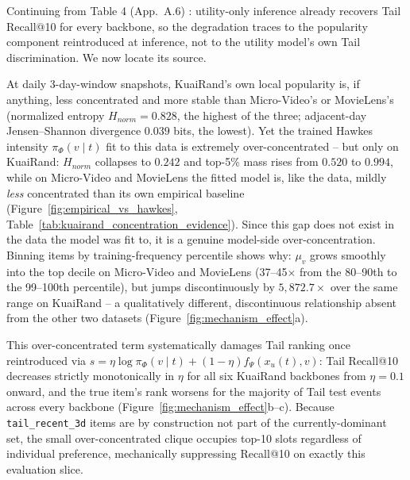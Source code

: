 Continuing from Table 4 (App.~A.6) %
: utility-only inference already recovers Tail Recall@10 for every backbone, so the
degradation traces to the popularity component reintroduced at inference, not to the
utility model's own Tail discrimination. We now locate its source.

At daily 3-day-window snapshots, KuaiRand's own local popularity is, if anything, less
concentrated and more stable than Micro-Video's or MovieLens's (normalized entropy
$H_{norm}=0.828$, the highest of the three; adjacent-day Jensen--Shannon divergence
$0.039$ bits, the lowest). Yet the trained Hawkes intensity $\pi_\Phi(v\mid t)$ fit to
this data is extremely over-concentrated -- but only on KuaiRand: $H_{norm}$ collapses to
$0.242$ and top-5\% mass rises from $0.520$ to $0.994$, while on Micro-Video and MovieLens
the fitted model is, like the data, mildly \emph{less} concentrated than its own empirical
baseline (Figure~\ref{fig:empirical_vs_hawkes}, Table~\ref{tab:kuairand_concentration_evidence}).
Since this gap does not exist in the data the model was fit to, it is a genuine
model-side over-concentration. Binning items by training-frequency percentile shows why:
$\mu_v$ grows smoothly into the top decile on Micro-Video and MovieLens (37--45$\times$
from the 80--90th to the 99--100th percentile), but jumps discontinuously by
$5{,}872.7\times$ over the same range on KuaiRand -- a qualitatively different,
discontinuous relationship absent from the other two datasets
(Figure~\ref{fig:mechanism_effect}a).

This over-concentrated term systematically damages Tail ranking once reintroduced via
$s=\eta\log\pi_\Phi(v\mid t)+(1-\eta)f_\Psi(x_u(t),v)$: Tail Recall@10 decreases strictly
monotonically in $\eta$ for all six KuaiRand backbones from $\eta=0.1$ onward, and the
true item's rank worsens for the majority of Tail test events across every backbone
(Figure~\ref{fig:mechanism_effect}b--c). Because \texttt{tail\_recent\_3d} items are by
construction not part of the currently-dominant set, the small over-concentrated clique
occupies top-10 slots regardless of individual preference, mechanically suppressing
Recall@10 on exactly this evaluation slice.

